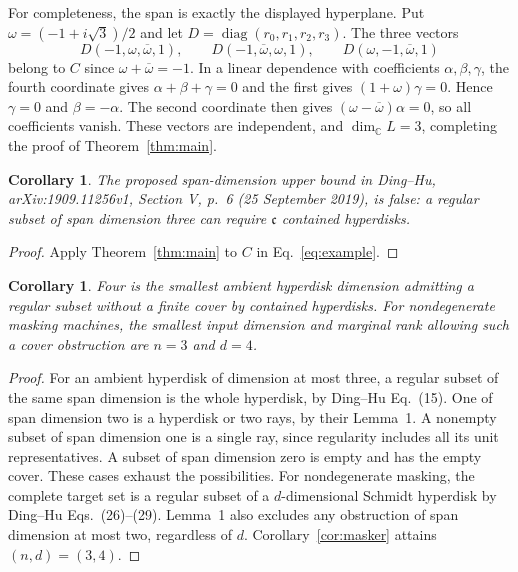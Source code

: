 \documentclass[11pt]{article}
\newtheorem{corollary}[theorem]{Corollary}
\newcommand{\C}{\mathbb C}
\newcommand{\diag}{\operatorname{diag}}
\begin{document}
For completeness, the span is exactly the displayed hyperplane.
Put $\omega=(-1+i\sqrt3)/2$ and let $D=\diag(r_0,r_1,r_2,r_3)$.
The three vectors
\begin{equation}\label{eq:basis}
 D(-1,\omega,\overline\omega,1),\qquad
 D(-1,\overline\omega,\omega,1),\qquad
 D(\omega,-1,\overline\omega,1)
\end{equation}
belong to $C$ since $\omega+\overline\omega=-1$.
In a linear dependence with coefficients $\alpha,\beta,\gamma$,
the fourth coordinate gives $\alpha+\beta+\gamma=0$ and the first gives
$(1+\omega)\gamma=0$. Hence $\gamma=0$ and $\beta=-\alpha$.
The second coordinate then gives $(\omega-\overline\omega)\alpha=0$,
so all coefficients vanish. These vectors are independent, and
$\dim_{\C}L=3$, completing the proof of Theorem~\ref{thm:main}.

\begin{corollary}\label{cor:old-bound}
The proposed span-dimension upper bound in Ding--Hu,
arXiv:1909.11256v1, Section V, p.~6 (25 September 2019), is false:
a regular subset of span dimension three can require $\mathfrak c$
contained hyperdisks.
\end{corollary}
\begin{proof}
Apply Theorem~\ref{thm:main} to $C$ in Eq.~\eqref{eq:example}.
\end{proof}

\begin{corollary}\label{cor:minimal}
Four is the smallest ambient hyperdisk dimension admitting a regular
subset without a finite cover by contained hyperdisks.
For nondegenerate masking machines, the smallest input dimension and
marginal rank allowing such a cover obstruction are $n=3$ and $d=4$.
\end{corollary}
\begin{proof}
For an ambient hyperdisk of dimension at most three, a regular subset
of the same span dimension is the whole hyperdisk, by Ding--Hu Eq.~(15).
One of span dimension two is a hyperdisk or two rays, by their Lemma~1.
A nonempty subset of span dimension one is a single ray, since regularity
includes all its unit representatives. A subset of span dimension zero
is empty and has the empty cover. These cases exhaust the possibilities.
For nondegenerate masking, the complete target set is a regular subset
of a $d$-dimensional Schmidt hyperdisk by Ding--Hu Eqs.~(26)--(29).
Lemma~1 also excludes any obstruction of span dimension at most two,
regardless of $d$. Corollary~\ref{cor:masker} attains $(n,d)=(3,4)$.
\end{proof}
\end{document}
